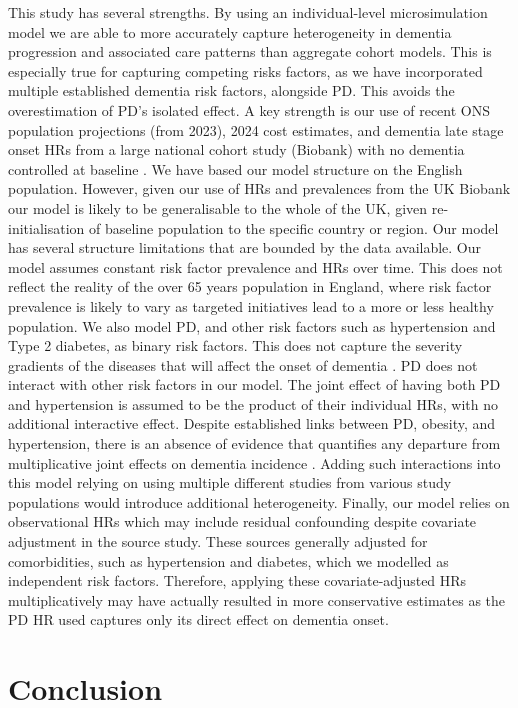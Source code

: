 \documentclass[11pt,a4paper]{article}
\begin{document}
This study has several strengths. By using an individual-level microsimulation model we are able to more accurately capture heterogeneity in dementia progression and associated care patterns than aggregate cohort models. This is especially true for capturing competing risks factors, as we have incorporated multiple established dementia risk factors, alongside PD. This avoids the overestimation of PD's isolated effect. A key strength is our use of recent ONS population projections (from 2023), 2024 cost estimates, and dementia late stage onset HRs from a large national cohort study (Biobank) with no dementia controlled at baseline \cite{ref32}. We have based our model structure on the English population. However, given our use of HRs and prevalences from the UK Biobank our model is likely to be generalisable to the whole of the UK, given re-initialisation of baseline population to the specific country or region.
Our model has several structure limitations that are bounded by the data available. Our model assumes constant risk factor prevalence and HRs over time. This does not reflect the reality of the over 65 years population in England, where risk factor prevalence is likely to vary as targeted initiatives lead to a more or less healthy population. We also model PD, and other risk factors such as hypertension and Type 2 diabetes, as binary risk factors. This does not capture the severity gradients of the diseases that will affect the onset of dementia \cite{ref49}. PD does not interact with other risk factors in our model. The joint effect of having both PD and hypertension is assumed to be the product of their individual HRs, with no additional interactive effect. Despite established links between PD, obesity, and hypertension, there is an absence of evidence that quantifies any departure from multiplicative joint effects on dementia incidence \cite{ref50}. Adding such interactions into this model relying on using multiple different studies from various study populations would introduce additional heterogeneity. Finally, our model relies on observational HRs which may include residual confounding despite covariate adjustment in the source study. These sources generally adjusted for comorbidities, such as hypertension and diabetes, which we modelled as independent risk factors. Therefore, applying these covariate-adjusted HRs multiplicatively may have actually resulted in more conservative estimates as the PD HR used captures only its direct effect on dementia onset.

\section{Conclusion}
\end{document}
